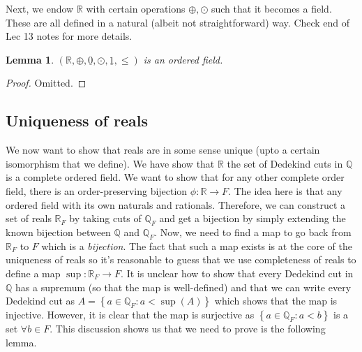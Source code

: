 \documentclass{article}
\newcommand\R{\ensuremath{\mathbb{R}}}
\newcommand\Q{\ensuremath{\mathbb{Q}}}
\newtheorem{lemma}[theorem]{Lemma}
\theoremstyle{definition}
\theoremstyle{remark}
\theoremstyle{plain}
\begin{document}
Next, we endow \(\R\) with certain operations \(\oplus, \odot\) such that it becomes a field. These are all defined in a natural (albeit not straightforward) way. Check end of Lec 13 notes for more details. 

\begin{lemma}
    \((\R, \oplus, \underline{0}, \odot, \underline{1}, \leq)\) is an ordered field. 
\end{lemma}
\begin{proof}
    Omitted. 
\end{proof}

\subsection{Uniqueness of reals}

We now want to show that reals are in some sense unique (upto a certain isomorphism that we define). We have show that \(\R\) the 
set of Dedekind cuts in \(\Q\) is a complete ordered field. We want to show that for any other complete order field, there is an order-preserving bijection \(\phi: \R \to F\).
The idea here is that any ordered field  with its own naturals and rationals. Therefore, we can construct a set of reals \(\R_F\) by taking cuts of \(\Q_F\) and get a bijection by simply extending the known 
bijection between \(\Q\) and \(\Q_F\). Now, we need to find a map to go back from \(\R_F\) to \(F\) which is a \emph{bijection}. The fact that such a map exists is at the core of the uniqueness of reals so it's reasonable to guess that
we use completeness of reals to define a map \(\sup: \R_F \to F\). It is unclear how to show that every Dedekind cut in \(\Q\) has a supremum (so that the map is well-defined) and that we can write every Dedekind cut as \(A = \left\{ a \in
\Q_F: a < \sup(A) \right\}\) which shows that the map is injective. However, it is clear that the map is surjective as \(\left\{ a \in \Q_F: a < b \right\}\) is a set \(\forall b \in F\).  This discussion shows us that we need to prove is the
following lemma. 
\end{document}
